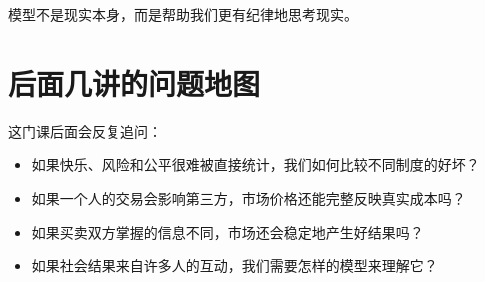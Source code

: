 \documentclass[10pt,a4paper]{ctexart}
\begin{document}
模型不是现实本身，而是帮助我们更有纪律地思考现实。

\section{后面几讲的问题地图}

这门课后面会反复追问：

\begin{itemize}
  \item 如果快乐、风险和公平很难被直接统计，我们如何比较不同制度的好坏？
  \item 如果一个人的交易会影响第三方，市场价格还能完整反映真实成本吗？
  \item 如果买卖双方掌握的信息不同，市场还会稳定地产生好结果吗？
  \item 如果社会结果来自许多人的互动，我们需要怎样的模型来理解它？
\end{itemize}
\end{document}
